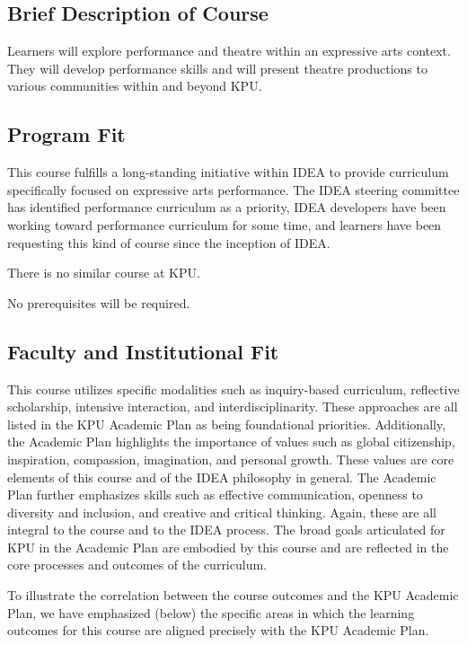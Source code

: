 \documentclass[letterpaper,10pt,headsepline]{scrreprt}
\begin{document}
\subsection{Brief Description of Course}

Learners will explore performance and theatre within an expressive arts
context. They will develop performance skills and will present theatre
productions to various communities within and beyond KPU.

\subsection{Program Fit}

This course fulfills a long-standing initiative within IDEA to provide
curriculum specifically focused on expressive arts performance. The IDEA
steering committee has identified performance curriculum as a priority,
IDEA developers have been working toward performance curriculum for some
time, and learners have been requesting this kind of course since the
inception of IDEA.

There is no similar course at KPU.

No prerequisites will be required.

\subsection{Faculty and Institutional Fit}

This course utilizes specific modalities such as inquiry-based
curriculum, reflective scholarship, intensive interaction, and
interdisciplinarity. These approaches are all listed in the KPU Academic
Plan as being foundational priorities. Additionally, the Academic Plan
highlights the importance of values such as global citizenship,
inspiration, compassion, imagination, and personal growth. These values
are core elements of this course and of the IDEA philosophy in general.
The Academic Plan further emphasizes skills such as effective
communication, openness to diversity and inclusion, and creative and
critical thinking. Again, these are all integral to the course and to
the IDEA process. The broad goals articulated for KPU in the Academic
Plan are embodied by this course and are reflected in the core processes
and outcomes of the curriculum.

To illustrate the correlation between the course outcomes and the KPU
Academic Plan, we have emphasized (below) the specific areas in which
the learning outcomes for this course are aligned precisely with the KPU
Academic Plan.
\end{document}
